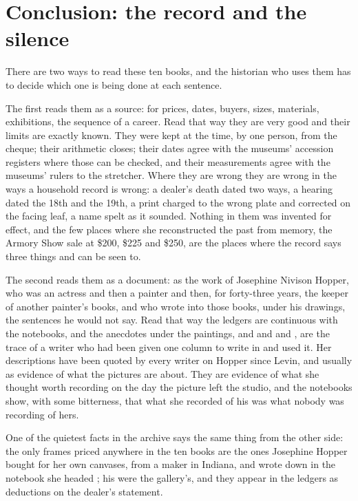 \chapter{Conclusion: the record and the silence}

There are two ways to read these ten books, and the historian who uses them has to decide which one is being done at each sentence.

The first reads them as a source: for prices, dates, buyers, sizes, materials, exhibitions, the sequence of a career. Read that way they are very good and their limits are exactly known. They were kept at the time, by one person, from the cheque; their arithmetic closes; their dates agree with the museums' accession registers where those can be checked, and their measurements agree with the museums' rulers to the stretcher. Where they are wrong they are wrong in the ways a household record is wrong: a dealer's death dated two ways, a hearing dated the 18th and the 19th, a print charged to the wrong plate and corrected on the facing leaf, a name spelt as it sounded. Nothing in them was invented for effect, and the few places where she reconstructed the past from memory, the Armory Show sale at \$200, \$225 and \$250, are the places where the record says three things and can be seen to.

The second reads them as a document: as the work of Josephine Nivison Hopper, who was an actress and then a painter and then, for forty-three years, the keeper of another painter's books, and who wrote into those books, under his drawings, the sentences he would not say. Read that way the ledgers are continuous with the notebooks, and the anecdotes under the paintings,  and  and  and , are the trace of a writer who had been given one column to write in and used it. Her descriptions have been quoted by every writer on Hopper since Levin, and usually as evidence of what the pictures are about. They are evidence of what she thought worth recording on the day the picture left the studio, and the notebooks show, with some bitterness, that what she recorded of his was what nobody was recording of hers.

One of the quietest facts in the archive says the same thing from the other side: the only frames priced anywhere in the ten books are the ones Josephine Hopper bought for her own canvases, from a maker in Indiana, and wrote down in the notebook she headed ; his were the gallery's, and they appear in the ledgers as deductions on the dealer's statement.

